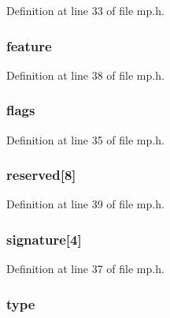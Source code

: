 Definition at line 33 of file mp.\-h.

\hypertarget{structmpproc_a2336e944364e02cfce4790bb4f0939fb}{
\subsubsection[{feature}]{ feature}}\label{structmpproc_a2336e944364e02cfce4790bb4f0939fb}


Definition at line 38 of file mp.\-h.

\hypertarget{structmpproc_abe146a6a9523880d7ce48965f8d07b34}{
\subsubsection[{flags}]{ flags}}\label{structmpproc_abe146a6a9523880d7ce48965f8d07b34}


Definition at line 35 of file mp.\-h.

\hypertarget{structmpproc_a5ec0760e684b75fdefef7023af0a3c72}{
\subsubsection[{reserved}]{ reserved\mbox{[}8\mbox{]}}}\label{structmpproc_a5ec0760e684b75fdefef7023af0a3c72}


Definition at line 39 of file mp.\-h.

\hypertarget{structmpproc_a086ff3269e8b74e0f05b9120d4cac23b}{
\subsubsection[{signature}]{ signature\mbox{[}4\mbox{]}}}\label{structmpproc_a086ff3269e8b74e0f05b9120d4cac23b}


Definition at line 37 of file mp.\-h.

\hypertarget{structmpproc_a7720cfa5e476235d84bbe5bb8ad56959}{
\subsubsection[{type}]{ type}}\label{structmpproc_a7720cfa5e476235d84bbe5bb8ad56959}


